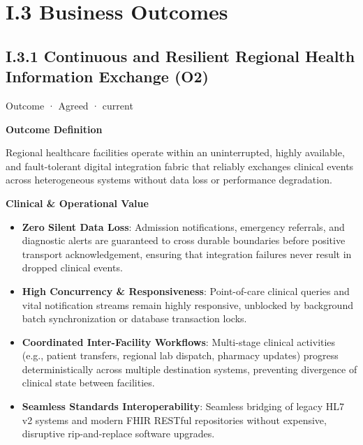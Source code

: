 \chapter*{I.3 Business Outcomes}
\label{navigation:I.3}

\section*{I.3.1 Continuous and Resilient Regional Health Information Exchange (O2)}
\label{navigation:I.3.1}

\label{element:aed90b4a88f24b78adfeadbf0bca8980}
{\small Outcome · Agreed · current}\par

\par\medskip\textbf{Outcome Definition}\par


Regional healthcare facilities operate within an uninterrupted, highly available, and fault-tolerant digital integration fabric that reliably exchanges clinical events across heterogeneous systems without data loss or performance degradation.



\par\medskip\textbf{Clinical \& Operational Value}\par


\begin{itemize}


\item \textbf{Zero Silent Data Loss}: Admission notifications, emergency referrals, and diagnostic alerts are guaranteed to cross durable boundaries before positive transport acknowledgement, ensuring that integration failures never result in dropped clinical events.

\item \textbf{High Concurrency \& Responsiveness}: Point-of-care clinical queries and vital notification streams remain highly responsive, unblocked by background batch synchronization or database transaction locks.

\item \textbf{Coordinated Inter-Facility Workflows}: Multi-stage clinical activities (e.g., patient transfers, regional lab dispatch, pharmacy updates) progress deterministically across multiple destination systems, preventing divergence of clinical state between facilities.

\item \textbf{Seamless Standards Interoperability}: Seamless bridging of legacy HL7 v2 systems and modern FHIR RESTful repositories without expensive, disruptive rip-and-replace software upgrades.

\end{itemize}


